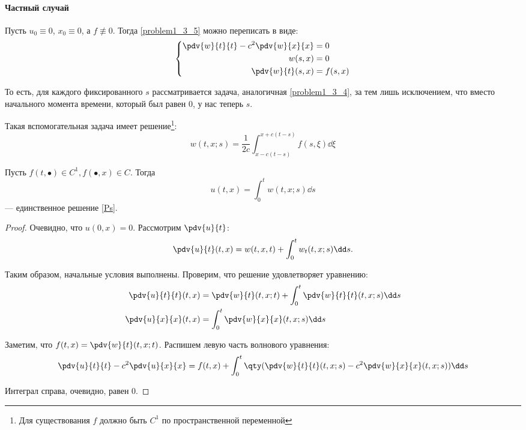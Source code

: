 \paragraph{Частный случай}

Пусть $u_0 \equiv 0$, $x_0 \equiv 0$, а $f \not\equiv 0$. Тогда \eqref{problem1_3_5} можно переписать в виде:
%
\begin{equation}
  \left\{\begin{aligned}
    \pdv{w}{t}{t} - c^2 \pdv{w}{x}{x} &= 0 \\
    w(s, x) &= 0 \\
    \pdv{w}{t} (s, x) &= f(s, x)
  \end{aligned}\right. \label{Ps}
\end{equation}

То есть, для каждого фиксированного $s$ рассматривается задача, аналогичная \eqref{problem1_3_4}, за тем лишь исключением, что вместо начального момента времени, который был равен $0$, у нас теперь $s$.

Такая вспомогательная задача имеет решение\footnote{Для существования $f$ должно быть $C^1$ по пространственной переменной}:
%
\begin{equation}
  w(t, x; s) = \frac{1}{2c} \int_{x-c(t-s)}^{x+c(t-s)} f(s, \xi) \dd \xi
\end{equation}

\begin{thm}
  Пусть $f(t, \bullet) \in C^1, f(\bullet, x) \in C$. Тогда
  \begin{equation}
    u(t, x) = \int_0^t w(t, x; s) \dd s
  \end{equation}
  --- единственное решение \eqref{Ps}.
\end{thm}

\begin{proof}
  Очевидно, что $u(0, x) = 0$. Рассмотрим $\pdv{u}{t}$:
  \begin{equation}
    \pdv{u}{t} (t, x) = w(t, x, t) + \int_0^t w_t(t, x; s) \dd s.
  \end{equation}
  
  Таким образом, начальные условия выполнены. Проверим, что решение удовлетворяет уравнению:
  \begin{align}
    \pdv{u}{t}{t} (t, x) &= \pdv{w}{t} (t, x; t) + \int_0^t \pdv{w}{t}{t} (t, x; s) \dd s \\
    \pdv{u}{x}{x} (t, x) &= \int_0^t \pdv{w}{x}{x} (t, x; s) \dd s
  \end{align}
  
  Заметим, что $f(t, x) = \pdv{w}{t} (t, x; t)$. Распишем левую часть волнового уравнения:
  \begin{equation}
    \pdv{u}{t}{t} - c^2 \pdv{u}{x}{x} = f(t, x) + \int_0^t \qty(\pdv{w}{t}{t} (t, x; s) - c^2 \pdv{w}{x}{x} (t, x; s)) \dd s
  \end{equation}
  
  Интеграл справа, очевидно, равен $0$.
\end{proof}

